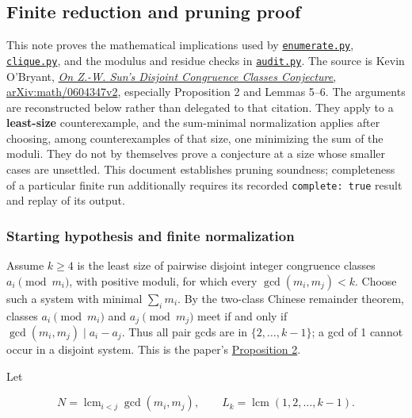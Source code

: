 \documentclass[11pt,a4paper]{article}
\begin{document}
\subsection{Finite reduction and pruning proof}\label{finite-reduction-and-pruning-proof}

This note proves the mathematical implications used by \href{https://github.com/mpelteshki/climbing-to-the-frontier/blob/212bba53b1818c08c40b8c4b48f636651eaf6410/cagent/p4/audit/enumerate.py}{\texttt{enumerate.py}}, \href{https://github.com/mpelteshki/climbing-to-the-frontier/blob/212bba53b1818c08c40b8c4b48f636651eaf6410/cagent/p4/audit/clique.py}{\texttt{clique.py}}, and the modulus and residue checks in \href{https://github.com/mpelteshki/climbing-to-the-frontier/blob/212bba53b1818c08c40b8c4b48f636651eaf6410/cagent/p4/audit/audit.py}{\texttt{audit.py}}. The source is Kevin O'Bryant, \href{https://arxiv.org/pdf/math/0604347v2}{\emph{On Z.-W. Sun's Disjoint Congruence Classes Conjecture}, arXiv:math/0604347v2}, especially Proposition 2 and Lemmas 5--6. The arguments are reconstructed below rather than delegated to that citation. They apply to a \textbf{least-size} counterexample, and the sum-minimal normalization applies after choosing, among counterexamples of that size, one minimizing the sum of the moduli. They do not by themselves prove a conjecture at a size whose smaller cases are unsettled. This document establishes pruning soundness; completeness of a particular finite run additionally requires its recorded \texttt{complete:\ true} result and replay of its output.

\subsubsection{Starting hypothesis and finite normalization}\label{starting-hypothesis-and-finite-normalization}

Assume \(k\ge4\) is the least size of pairwise disjoint integer congruence classes \(a_i\pmod{m_i}\), with positive moduli, for which every \(\gcd(m_i,m_j)<k\). Choose such a system with minimal \(\sum_i m_i\). By the two-class Chinese remainder theorem, classes \(a_i\pmod{m_i}\) and \(a_j\pmod{m_j}\) meet if and only if \(\gcd(m_i,m_j)\mid a_i-a_j\). Thus all pair gcds are in \(\{2,\ldots,k-1\}\); a gcd of 1 cannot occur in a disjoint system. This is the paper's \href{https://arxiv.org/pdf/math/0604347v2}{Proposition 2}.

Let

\[
  N=\operatorname{lcm}_{i<j}\gcd(m_i,m_j),\qquad
  L_k=\operatorname{lcm}(1,2,\ldots,k-1).
\]
\end{document}
